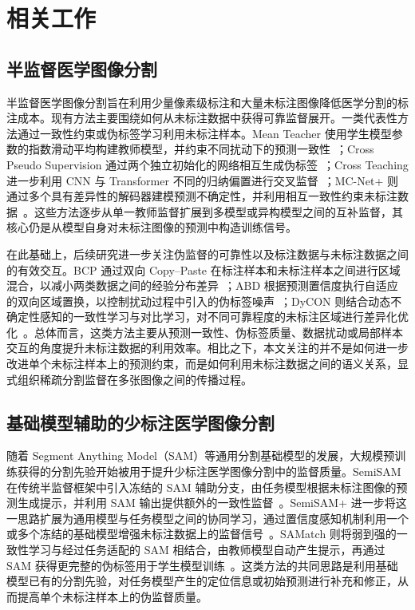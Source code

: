 \documentclass[UTF8,a4paper,10pt]{ctexart}
\begin{document}
\section{相关工作}

\subsection{半监督医学图像分割}

半监督医学图像分割旨在利用少量像素级标注和大量未标注图像降低医学分割的标注成本。现有方法主要围绕如何从未标注数据中获得可靠监督展开。一类代表性方法通过一致性约束或伪标签学习利用未标注样本。Mean Teacher 使用学生模型参数的指数滑动平均构建教师模型，并约束不同扰动下的预测一致性~\cite{tarvainen2017meanteacher}；Cross Pseudo Supervision 通过两个独立初始化的网络相互生成伪标签~\cite{chen2021cps}；Cross Teaching 进一步利用 CNN 与 Transformer 不同的归纳偏置进行交叉监督~\cite{luo2022crossteaching}；MC-Net+ 则通过多个具有差异性的解码器建模预测不确定性，并利用相互一致性约束未标注数据~\cite{wu2022mcnet}。这些方法逐步从单一教师监督扩展到多模型或异构模型之间的互补监督，其核心仍是从模型自身对未标注图像的预测中构造训练信号。

在此基础上，后续研究进一步关注伪监督的可靠性以及标注数据与未标注数据之间的有效交互。BCP 通过双向 Copy--Paste 在标注样本和未标注样本之间进行区域混合，以减小两类数据之间的经验分布差异~\cite{bai2023bcp}；ABD 根据预测置信度执行自适应的双向区域置换，以控制扰动过程中引入的伪标签噪声~\cite{chi2024abd}；DyCON 则结合动态不确定性感知的一致性学习与对比学习，对不同可靠程度的未标注区域进行差异化优化~\cite{assefa2025dycon}。总体而言，这类方法主要从预测一致性、伪标签质量、数据扰动或局部样本交互的角度提升未标注数据的利用效率。相比之下，本文关注的并不是如何进一步改进单个未标注样本上的预测约束，而是如何利用未标注数据之间的语义关系，显式组织稀疏分割监督在多张图像之间的传播过程。

\subsection{基础模型辅助的少标注医学图像分割}

随着 Segment Anything Model（SAM）等通用分割基础模型的发展，大规模预训练获得的分割先验开始被用于提升少标注医学图像分割中的监督质量。SemiSAM 在传统半监督框架中引入冻结的 SAM 辅助分支，由任务模型根据未标注图像的预测生成提示，并利用 SAM 输出提供额外的一致性监督~\cite{zhang2023semisam}。SemiSAM+ 进一步将这一思路扩展为通用模型与任务模型之间的协同学习，通过置信度感知机制利用一个或多个冻结的基础模型增强未标注数据上的监督信号~\cite{zhang2025semisamplus}。SAMatch 则将弱到强的一致性学习与经过任务适配的 SAM 相结合，由教师模型自动产生提示，再通过 SAM 获得更完整的伪标签用于学生模型训练~\cite{xu2024samatch}。这类方法的共同思路是利用基础模型已有的分割先验，对任务模型产生的定位信息或初始预测进行补充和修正，从而提高单个未标注样本上的伪监督质量。
\end{document}
